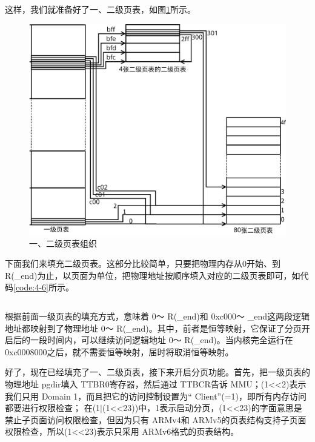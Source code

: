 \documentclass[main.tex]{subfiles}
\begin{document}
\begin{CJK*}{UTF8}{song}
\begin{code}
\label{code:4-5}
\inputminted[firstline=172,lastline=185,linenos,numbersep=5pt,frame=lines,framesep=2mm]{c}{src/chapter04/kernel/machdep.c}
\end{code}

这样，我们就准备好了一、二级页表，如图\ref{figure:4-6}所示。

\begin{figure}[htp]
\centering
\includegraphics[scale=0.3]{figures/4-6}
\caption{一、二级页表组织}
\label{figure:4-6}
\end{figure}

\par
下面我们来填充二级页表。这部分比较简单，只要把物理内存从0开始、到 R(\_end)为止，以页面为单位，把物理地址按顺序填入对应的二级页表即可，如代码\ref{code:4-6}所示。

\begin{code}
\label{code:4-6}
\inputminted[firstline=187,lastline=193,linenos,numbersep=5pt,frame=lines,framesep=2mm]{c}{src/chapter04/kernel/machdep.c}
\end{code}

根据前面一级页表的填充方式，意味着 0～ R(\_end)和 0xc000～ \_end这两段逻辑地址都映射到了物理地址 0～ R(\_end)。其中，前者是恒等映射，它保证了分页开启后的一段时间内，可以继续访问逻辑地址 0～ R(\_end)。当内核完全运行在 0xc000\-8000之后，就不需要恒等映射，届时将取消恒等映射。

\par
好了，现在已经填充了一、二级页表，接下来开启分页功能。首先，把一级页表的物理地址 pgdir填入 TTBR0寄存器，然后通过 TTBCR告诉 MMU；(1\textless\textless2)表示我们只用 Domain 1，而且把它的访问控制设置为“ Client”(=1)，即所有内存访问都要进行权限检查； 在(1$\mid$(1\textless\textless23))中，1表示启动分页，(1\textless\textless23)的字面意思是禁止子页面访问权限检查，但因为只有 ARMv4和 ARMv5的页表结构支持子页面权限检查，所以(1\textless\textless23)表示只采用 ARMv6格式的页表结构。


\end{CJK*}
\end{document}
